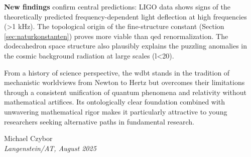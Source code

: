 \documentclass[11pt, a5paper, twoside, openright]{book}
\begin{document}
\textbf{New findings} confirm central predictions: LIGO data shows signs of the theoretically predicted frequency-dependent light deflection at high frequencies (>1 kHz). The topological origin of the fine-structure constant (Section \ref{sec:naturkonstanten}) proves more viable than \gls{qed} renormalization.
The dodecahedron space structure also plausibly explains the puzzling anomalies in the cosmic background radiation at large scales (l<20).

From a history of science perspective, the \gls{wdbt} stands in the tradition of mechanistic worldviews from Newton to Hertz but overcomes their limitations through a consistent unification
of quantum phenomena and relativity without mathematical artifices. Its ontologically clear foundation combined with unwavering mathematical rigor makes it particularly attractive to young
researchers seeking alternative paths in fundamental research.

\begin{flushright}
    Michael Czybor \\
    \emph{Langenstein/AT, August 2025}
\end{flushright}

\tableofcontents
\listoffigures
\listoftables

\mainmatter






\appendix


\backmatter
\printbibliography[title=Bibliography]
\glswritefiles
\printglossary[title=Glossary]
\printglossary[type=acronym, title=Abbreviations]
\end{document}
